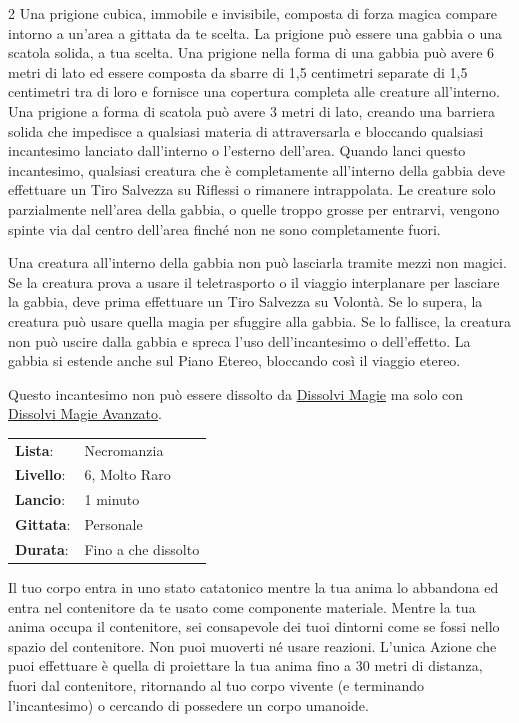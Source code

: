 \begin{multicols}{2}
Una prigione cubica, immobile e invisibile, composta di forza magica compare intorno a un'area a gittata da te scelta. La prigione può essere una gabbia o una scatola solida, a tua scelta. Una prigione nella forma di una gabbia può avere 6 metri di lato ed essere composta da sbarre di 1,5 centimetri separate di 1,5 centimetri tra di loro e fornisce una copertura completa alle creature all'interno. Una prigione a forma di scatola può avere 3 metri di lato, creando una barriera solida che impedisce a qualsiasi materia di attraversarla e bloccando qualsiasi incantesimo lanciato dall'interno o l'esterno dell'area. Quando lanci questo incantesimo, qualsiasi creatura che è completamente all'interno della gabbia deve effettuare un Tiro Salvezza su Riflessi o rimanere intrappolata. Le creature solo parzialmente nell'area della gabbia, o quelle troppo grosse per entrarvi, vengono spinte via dal centro dell'area finché non ne sono completamente fuori.

Una creatura all'interno della gabbia non può lasciarla tramite mezzi non magici. Se la creatura prova a usare il teletrasporto o il viaggio interplanare per lasciare la gabbia, deve prima effettuare un Tiro Salvezza su Volontà. Se lo supera, la creatura può usare quella magia per sfuggire alla gabbia. Se lo fallisce, la creatura non può uscire dalla gabbia e spreca l'uso dell'incantesimo o dell'effetto. La gabbia si estende anche sul Piano Etereo, bloccando così il viaggio etereo.

Questo incantesimo non può essere dissolto da \hyperlink{dissolvimagie}{Dissolvi Magie} ma solo con \hyperlink{dissolvimagieavanzato}{Dissolvi Magie Avanzato}.

\noindent\begin{tabularx}{\linewidth}{p{1.9cm}X}
	\rowcolor{gray!20}\textbf{Lista}: & Necromanzia \\
	\textbf{Livello}: & 6, Molto Raro \\
	\rowcolor{gray!20}\textbf{Lancio}: & 1 minuto \\
	\textbf{Gittata}: & Personale \\
	\rowcolor{gray!20}\textbf{Durata}: & Fino a che dissolto \\
\end{tabularx}\smallskip

Il tuo corpo entra in uno stato catatonico mentre la tua anima lo abbandona ed entra nel contenitore da te usato come componente materiale. Mentre la tua anima occupa il contenitore, sei consapevole dei tuoi dintorni come se fossi nello spazio del contenitore. Non puoi muoverti né usare reazioni. L'unica Azione che puoi effettuare è quella di proiettare la tua anima fino a 30 metri di distanza, fuori dal contenitore, ritornando al tuo corpo vivente (e terminando l'incantesimo) o cercando di possedere un corpo umanoide.


\end{multicols}
